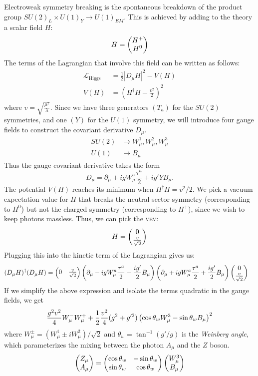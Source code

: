 Electroweak symmetry breaking is the spontaneous breakdown of the product group $SU(2)_L\times U(1)_Y\rightarrow U(1)_{EM}$. This is achieved by adding to the theory a scalar field $H$:
$$H = \begin{pmatrix} H^+ \\ H^0\end{pmatrix}$$
The terms of the Lagrangian that involve this field can be written as follows:
\begin{align}
  \label{eq:higgs_kinetic}
  \mathcal{L}_{\text{Higgs}} &= \frac{1}{2}\left|D_\mu H\right|^2-V(H)\\
  \label{eq:higgs_potential}
  V(H) &= \left(H^\dag H-\frac{v^2}{2}\right)^2
\end{align}
where $v = \sqrt{\frac{\mu^2}{\lambda}}$. Since we have three generators $(T_a)$ for the $SU(2)$ symmetries, and one $(Y)$ for the $U(1)$ symmetry, we will introduce four gauge fields to construct the covariant derivative $D_\mu$.
\begin{align*}
  SU(2)&\rightarrow W_\mu^1,W_\mu^2, W_\mu^3\\
  U(1)&\rightarrow B_\mu
\end{align*}
Thus the gauge covariant derivative takes the form
$$D_\mu = \partial_\mu + igW_\mu^a\frac{\tau^a}{2}+ig'YB_\mu.$$
The potential $V(H)$ reaches its minimum when $H^\dag H = v^2 / 2$. We pick a vacuum expectation value for $H$ that breaks the neutral sector symmetry (corresponding to $H^0$) but not the charged symmetry (corresponding to $H^{+}$), since we wish to keep photons massless. Thus, we can pick the \textsc{vev}:
$$H = \begin{pmatrix} 0 \\ \frac{v}{\sqrt{2}}\end{pmatrix}$$
Plugging this into the kinetic term of the Lagrangian gives us:
\begin{align*}
  (D_\mu H)^\dag(D_\mu H) &= \begin{pmatrix} 0 & \frac{v}{\sqrt{2}}\end{pmatrix}
  \left(\partial_\mu - igW_\mu^a\frac{\tau^a}{2}
  -\frac{ig'}{2}B_\mu\right)
  \left(\partial_\mu+igW_\mu^a\frac{\tau^a}{2}+\frac{ig'}{2}B_\mu\right)
  \begin{pmatrix} 0 \\ \frac{v}{\sqrt{2}}\end{pmatrix}
\end{align*}
If we simplify the above expression and isolate the terms quadratic in the gauge fields, we get
\[\frac{g^2v^2}{4}W_\mu^-W_\mu^++\frac{1}{2}\frac{v^2}{4}(g^2+g'^2)
\left(\cos\theta_w W_\mu^3 - \sin\theta_w B_\mu\right)^2\]
where $W_\mu^\pm = (W_\mu^1\pm iW_\mu^2)/\sqrt{2}$  and $\theta_w = \tan^{-1}(g'/g)$ is the \emph{Weinberg angle}, which parameterizes the mixing between the photon $A_\mu$ and the $Z$ boson.
\begin{equation}\label{eq:z_a_mixing}
\begin{pmatrix} Z_\mu \\ A_\mu\end{pmatrix} = \begin{pmatrix} \cos\theta_w & -\sin\theta_w \\ \sin\theta_w & \cos\theta_w\end{pmatrix}
\begin{pmatrix} W_{\mu}^{3} \\ B_{\mu}\end{pmatrix}
\end{equation}
